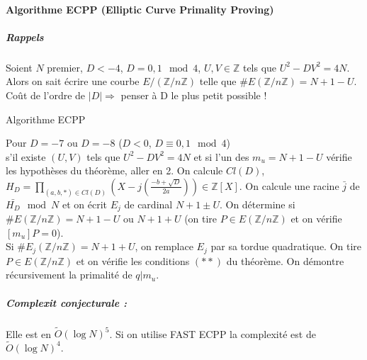 \documentclass[12pt,a4paper]{report}
\begin{document}
\paragraph{Algorithme ECPP (Elliptic Curve Primality Proving)\\}
\subparagraph{Rappels\\}
Soient $ N$ premier, $D<-4$, $D=0,1 \mod 4$, $U,V \in \mathbb{Z}$ tels que $U^2 -DV^2 = 4N$. \\
Alors on sait écrire une courbe $E/(\mathbb{Z}/n\mathbb{Z})$ telle que $\# E(\mathbb{Z}/n\mathbb{Z})=N+1-U$.\\
Coût de l'ordre de $|D| \Rightarrow $ penser à  D le plus petit possible !
\begin{algorithm}[ht]
\caption{Algorithme ECPP}
\begin{algorithmic}[1]
\STATE Pour $D=-7$ ou $D=-8$ ($D<0$, $D\equiv 0,1 \mod 4$)\\
s'il existe $(U,V)$ tels que $U^2 - DV^2 =4N$ et si l'un des $m_u = N+1-U$ vérifie les hypothèses du théorème, aller en 2.
\STATE On calcule $Cl(D)$, $\displaystyle H_D = \prod_{(a,b,*)\in Cl(D)} \left( X-j\left(\frac{-b+\sqrt{D}}{2a}\right)\right) \in \mathbb{Z}[X]$.
\STATE On calcule une racine $\bar{j}$ de $\bar{H_D} \mod N$ et on écrit $E_j$ de cardinal $N+1\pm U$.
\STATE On détermine si $\#E(\mathbb{Z}/n\mathbb{Z})=N+1-U$ ou $N+1+U$ (on tire $P\in E(\mathbb{Z}/n\mathbb{Z})$ et on vérifie $[m_u]P=0$).\\
Si $\#E_j(\mathbb{Z}/n\mathbb{Z})=N+1+U$, on remplace $E_j$ par sa tordue quadratique.
\STATE On tire $P\in E(\mathbb{Z}/n\mathbb{Z})$ et on vérifie les conditions $(**)$ du théorème.
\STATE On démontre récursivement la primalité de $q|m_u$.
\end{algorithmic}
\end{algorithm}
\subparagraph{Complexit conjecturale :\\}
Elle est en $\tilde{O}(\log N)^5$. Si on utilise FAST ECPP la complexité est de $\tilde{O}(\log N)^4$.
\end{document}
